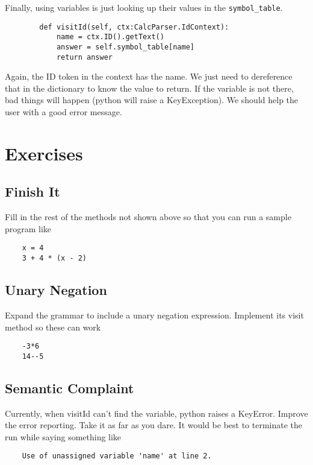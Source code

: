 Finally, using variables is just looking up their values in the
\verb+symbol_table+.

{\footnotesize
\begin{verbatim}
        def visitId(self, ctx:CalcParser.IdContext):
            name = ctx.ID().getText()
            answer = self.symbol_table[name]
            return answer
\end{verbatim}
}

Again, the ID token in the context has the name. We just need to
dereference that in the dictionary to know the value to return.
If the variable is not there, bad things will happen (python
will raise a KeyException). We should help the user with a good
error message.

\section{Exercises}

\subsection{Finish It}

Fill in the rest of the methods not shown above so that you can
run a sample program like

{\footnotesize
\begin{verbatim}
    x = 4
    3 + 4 * (x - 2)
\end{verbatim}
}

\subsection{Unary Negation}

Expand the grammar to include a unary negation expression. Implement
its visit method so these can work

{\footnotesize
\begin{verbatim}
    -3*6
    14--5
\end{verbatim}
}

\subsection{Semantic Complaint}

Currently, when visitId can't find the variable, python raises
a KeyError. Improve the error reporting. Take it as far as you dare.
It would be best to terminate the run while saying something like

{\footnotesize
\begin{verbatim}
    Use of unassigned variable 'name' at line 2.
\end{verbatim}
}

